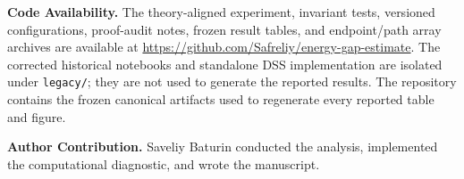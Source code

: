 \documentclass[pdflatex,sn-mathphys-num]{sn-jnl}
\theoremstyle{thmstyleone}
\theoremstyle{thmstyletwo}
\theoremstyle{thmstylethree}
\begin{document}
\textbf{Code Availability.} The theory-aligned experiment, invariant tests, versioned configurations, proof-audit notes, frozen result tables, and endpoint/path array archives are available at \url{https://github.com/Safreliy/energy-gap-estimate}. The corrected historical notebooks and standalone DSS implementation are isolated under \texttt{legacy/}; they are not used to generate the reported results. The repository contains the frozen canonical artifacts used to regenerate every reported table and figure.

\textbf{Author Contribution.} Saveliy Baturin conducted the analysis, implemented the computational diagnostic, and wrote the manuscript.


\end{document}
